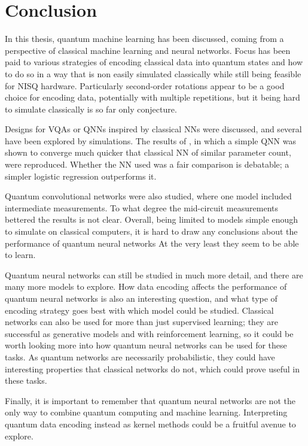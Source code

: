 \chapter{Conclusion}
\label{chap:conclusion}
In this thesis, quantum machine learning has been discussed, coming from a perspective of classical machine learning and neural networks.
Focus has been paid to various strategies of encoding classical data into quantum states and how to do so in a way that is non easily simulated classically while still being feasible for NISQ hardware.
Particularly second-order rotations appear to be a good choice for encoding data, potentially with multiple repetitions, but it being hard to simulate classically is so far only conjecture.

Designs for VQAs or QNNs inspired by classical NNs were discussed, and several have been explored by simulations.
The results of \cite{abbas2021}, in which a simple QNN was shown to converge much quicker that classical NN of similar parameter count, were reproduced.
Whether the NN used was a fair comparison is debatable; a simpler logistic regression outperforms it.

Quantum convolutional networks were also studied, where one model included intermediate measurements.
To what degree the mid-circuit measurements bettered the results is not clear.
Overall, being limited to models simple enough to simulate on classical computers, it is hard to draw any conclusions about the performance of quantum neural networks
At the very least they seem to be able to learn.

Quantum neural networks can still be studied in much more detail, and there are many more models to explore.
How data encoding affects the performance of quantum neural networks is also an interesting question, and what type of encoding strategy goes best with which model could be studied.
Classical networks can also be used for more than just supervised learning; they are successful as generative models and with reinforcement learning, so it could be worth looking more into how quantum neural networks can be used for these tasks.
As quantum networks are necessarily probabilistic, they could have interesting properties that classical networks do not, which could prove useful in these tasks.

Finally, it is important to remember that quantum neural networks are not the only way to combine quantum computing and machine learning.
Interpreting quantum data encoding instead as kernel methods could be a fruitful avenue to explore.

